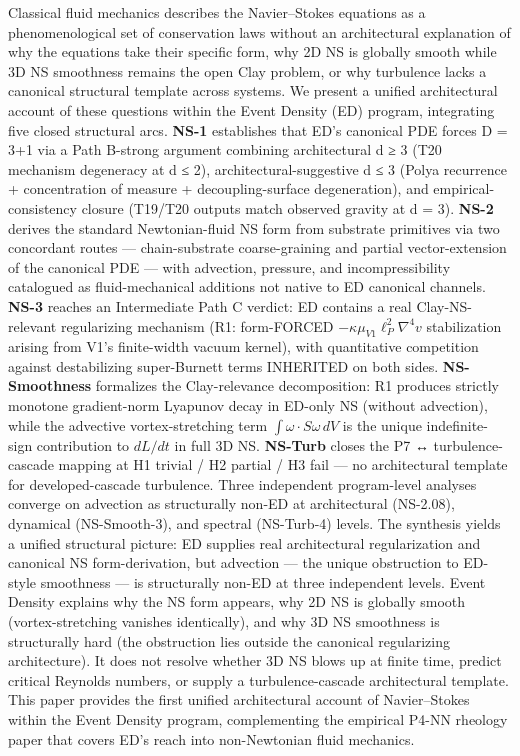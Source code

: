 \documentclass[
]{article}
\begin{document}
Classical fluid mechanics describes the Navier--Stokes equations as a
phenomenological set of conservation laws without an architectural
explanation of why the equations take their specific form, why 2D NS is
globally smooth while 3D NS smoothness remains the open Clay problem, or
why turbulence lacks a canonical structural template across systems. We
present a unified architectural account of these questions within the
Event Density (ED) program, integrating five closed structural arcs.
\textbf{NS-1} establishes that ED's canonical PDE forces D = 3+1 via a
Path B-strong argument combining architectural d ≥ 3 (T20 mechanism
degeneracy at d ≤ 2), architectural-suggestive d ≤ 3 (Polya recurrence +
concentration of measure + decoupling-surface degeneration), and
empirical-consistency closure (T19/T20 outputs match observed gravity at
d = 3). \textbf{NS-2} derives the standard Newtonian-fluid NS form from
substrate primitives via two concordant routes --- chain-substrate
coarse-graining and partial vector-extension of the canonical PDE ---
with advection, pressure, and incompressibility catalogued as
fluid-mechanical additions not native to ED canonical channels.
\textbf{NS-3} reaches an Intermediate Path C verdict: ED contains a real
Clay-NS-relevant regularizing mechanism (R1: form-FORCED
\(-\kappa\mu_{V1}\ell_P^2 \nabla^4 v\) stabilization arising from V1's
finite-width vacuum kernel), with quantitative competition against
destabilizing super-Burnett terms INHERITED on both sides.
\textbf{NS-Smoothness} formalizes the Clay-relevance decomposition: R1
produces strictly monotone gradient-norm Lyapunov decay in ED-only NS
(without advection), while the advective vortex-stretching term
\(\int\omega\cdot S\omega\,dV\) is the unique indefinite-sign
contribution to \(dL/dt\) in full 3D NS. \textbf{NS-Turb} closes the P7
↔ turbulence-cascade mapping at H1 trivial / H2 partial / H3 fail --- no
architectural template for developed-cascade turbulence. Three
independent program-level analyses converge on advection as structurally
non-ED at architectural (NS-2.08), dynamical (NS-Smooth-3), and spectral
(NS-Turb-4) levels. The synthesis yields a unified structural picture:
ED supplies real architectural regularization and canonical NS
form-derivation, but advection --- the unique obstruction to ED-style
smoothness --- is structurally non-ED at three independent levels. Event
Density explains why the NS form appears, why 2D NS is globally smooth
(vortex-stretching vanishes identically), and why 3D NS smoothness is
structurally hard (the obstruction lies outside the canonical
regularizing architecture). It does not resolve whether 3D NS blows up
at finite time, predict critical Reynolds numbers, or supply a
turbulence-cascade architectural template. This paper provides the first
unified architectural account of Navier--Stokes within the Event Density
program, complementing the empirical P4-NN rheology paper that covers
ED's reach into non-Newtonian fluid mechanics.
\end{document}
